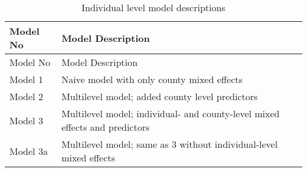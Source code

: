 \documentclass[12pt,twoside]{reedthesis}
\begin{document}
  \begin{longtable}[]{@{}ll@{}}
  \caption{Individual level model descriptions
  \label{tab:model_desc_individual}}\tabularnewline
  \toprule
  \begin{minipage}[b]{0.15\columnwidth}\raggedright\strut
  Model No\strut
  \end{minipage} & \begin{minipage}[b]{0.80\columnwidth}\raggedright\strut
  Model Description\strut
  \end{minipage}\tabularnewline
  \midrule
  \endfirsthead
  \toprule
  \begin{minipage}[b]{0.15\columnwidth}\raggedright\strut
  Model No\strut
  \end{minipage} & \begin{minipage}[b]{0.80\columnwidth}\raggedright\strut
  Model Description\strut
  \end{minipage}\tabularnewline
  \midrule
  \endhead
  \begin{minipage}[t]{0.15\columnwidth}\raggedright\strut
  Model 1\strut
  \end{minipage} & \begin{minipage}[t]{0.80\columnwidth}\raggedright\strut
  Naive model with only county mixed effects\strut
  \end{minipage}\tabularnewline
  \begin{minipage}[t]{0.15\columnwidth}\raggedright\strut
  Model 2\strut
  \end{minipage} & \begin{minipage}[t]{0.80\columnwidth}\raggedright\strut
  Multilevel model; added county level predictors\strut
  \end{minipage}\tabularnewline
  \begin{minipage}[t]{0.15\columnwidth}\raggedright\strut
  Model 3\strut
  \end{minipage} & \begin{minipage}[t]{0.80\columnwidth}\raggedright\strut
  Multilevel model; individual- and county-level mixed effects and
  predictors\strut
  \end{minipage}\tabularnewline
  \begin{minipage}[t]{0.15\columnwidth}\raggedright\strut
  Model 3a\strut
  \end{minipage} & \begin{minipage}[t]{0.80\columnwidth}\raggedright\strut
  Multilevel model; same as 3 without individual-level mixed effects\strut
  \end{minipage}\tabularnewline

\end{longtable}
\end{document}
